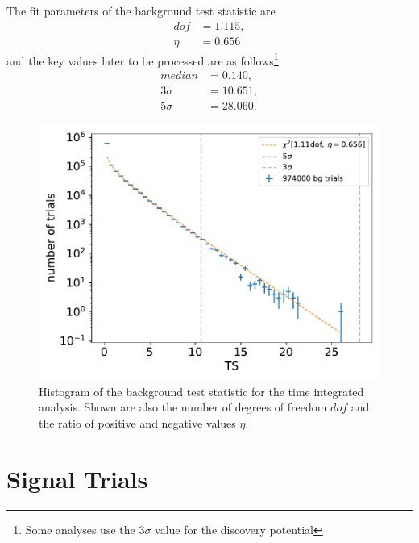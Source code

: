 The fit parameters of the background test statistic are
\begin{align}
  dof &= \num{1.115},\\
  \eta &= \num{0.656}
\end{align}
and the key values later to be processed are as follows\footnote{Some analyses use the $3\sigma$ value for the discovery potential}
\begin{align}
  median &= \num{0.140},\\
  3\sigma &= \num{10.651},\\
  5\sigma &= \num{28.060}.
\end{align}

\begin{figure}
    \centering
    \includegraphics[width=\linewidth]{Plots/05_csky/9_years_gfu_gold_bg_new.pdf}
    \caption{Histogram of the background test statistic for the time integrated analysis. Shown are also the number of degrees of freedom $dof$ and the ratio of positive and negative values $\eta$.}
    \label{fig:bg_ts_time_int}
\end{figure}

\section{Signal Trials}

